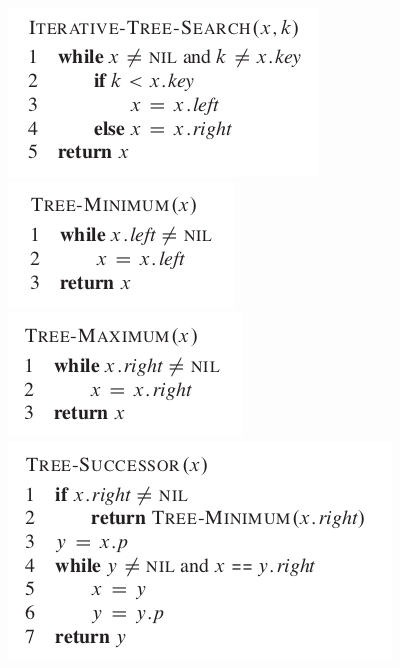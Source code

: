 \documentclass[11pt]{article}
\begin{document}
\includegraphics[width=.9\linewidth]{pics/c12_iterative_tree_search.png} \\

\includegraphics[width=.9\linewidth]{pics/c12_tree_minimum.png} \\

\includegraphics[width=.9\linewidth]{pics/c12_tree_maximum.png} \\

\includegraphics[width=.9\linewidth]{pics/c12_tree_successor.png} \\
\end{document}
